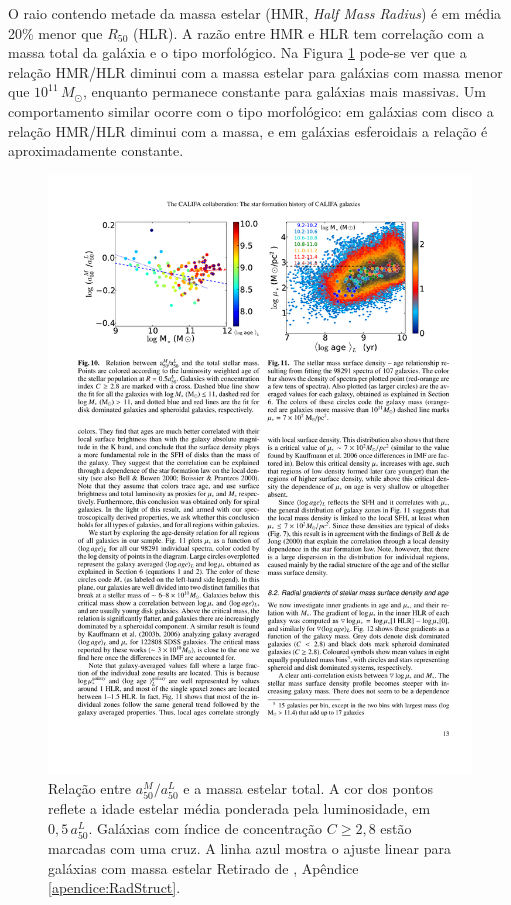 O raio contendo metade da massa estelar (HMR, {\em Half Mass Radius}) é em média
20\% menor que $R_{50}$ (HLR). A razão entre HMR e HLR tem correlação com a
massa total da galáxia e o tipo morfológico. Na Figura \ref{fig:radStruct2}
pode-se ver que a relação HMR/HLR diminui com a massa estelar para galáxias com
massa menor que $10^{11}\,M_\odot$, enquanto permanece constante para galáxias
mais massivas. Um comportamento similar ocorre com o tipo morfológico:
em galáxias com disco a relação HMR/HLR diminui com a massa, e em galáxias
esferoidais a relação é aproximadamente constante.

\begin{figure}
	\includegraphics{figuras/radstruct-02}
	\caption[Relação entre $a^M_{50}/a^L_{50}$ e a massa estelar total]
	{Relação entre $a^M_{50}/a^L_{50}$ e a massa estelar total. A cor dos
	pontos reflete a idade estelar média ponderada pela luminosidade, em $0,5\,a^L_{50}$.
	Galáxias com índice de concentração $C \geq 2,8$ estão marcadas com uma cruz. A
	linha azul mostra o ajuste linear para galáxias com massa estelar Retirado de
	\cite[figura 10]{GonzalezDelgado2013}, Apêndice
	\ref{apendice:RadStruct}.}
	\label{fig:radStruct2}
\end{figure}

